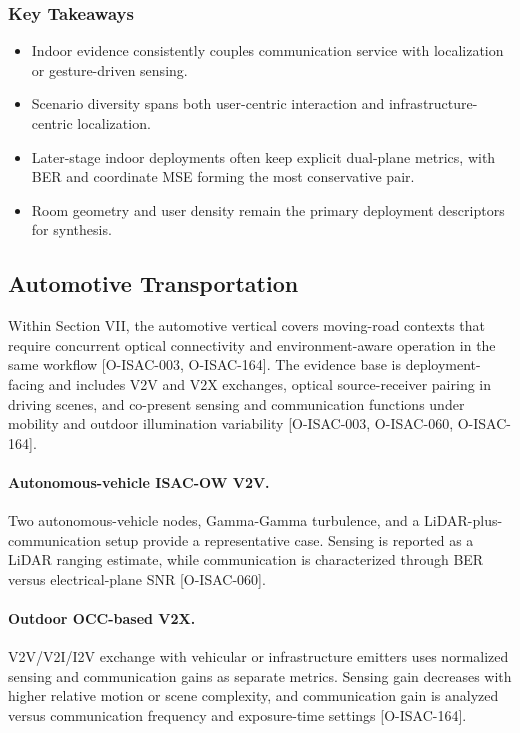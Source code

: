\subsubsection{Key Takeaways}
\begin{itemize}
\item Indoor evidence consistently couples communication service with localization or gesture-driven sensing.
\item Scenario diversity spans both user-centric interaction and infrastructure-centric localization.
\item Later-stage indoor deployments often keep explicit dual-plane metrics, with BER and coordinate MSE forming the most conservative pair.
\item Room geometry and user density remain the primary deployment descriptors for synthesis.
\end{itemize}

\subsection{Automotive Transportation}
\label{subsec:apps-automotive}

Within Section VII, the automotive vertical covers moving-road contexts that require concurrent optical connectivity and environment-aware operation in the same workflow [O-ISAC-003, O-ISAC-164]. The evidence base is deployment-facing and includes V2V and V2X exchanges, optical source-receiver pairing in driving scenes, and co-present sensing and communication functions under mobility and outdoor illumination variability [O-ISAC-003, O-ISAC-060, O-ISAC-164].

\paragraph{Autonomous-vehicle ISAC-OW V2V.}
Two autonomous-vehicle nodes, Gamma-Gamma turbulence, and a LiDAR-plus-communication setup provide a representative case. Sensing is reported as a LiDAR ranging estimate, while communication is characterized through BER versus electrical-plane SNR [O-ISAC-060].

\paragraph{Outdoor OCC-based V2X.}
V2V/V2I/I2V exchange with vehicular or infrastructure emitters uses normalized sensing and communication gains as separate metrics. Sensing gain decreases with higher relative motion or scene complexity, and communication gain is analyzed versus communication frequency and exposure-time settings [O-ISAC-164].

